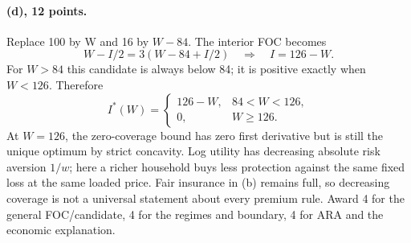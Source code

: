 \paragraph{(d), 12 points.}
Replace 100 by W and 16 by $W-84$. The interior FOC becomes
\[
 W-I/2=3(W-84+I/2)\quad\Rightarrow\quad I=126-W.
\]
For $W>84$ this candidate is always below 84; it is positive exactly when
$W<126$. Therefore
\[
 I^*(W)=\begin{cases}126-W,&84<W<126,\\0,&W\ge126.\end{cases}
\]
At $W=126$, the zero-coverage bound has zero first derivative but is still
the unique optimum by strict concavity. Log utility has decreasing absolute
risk aversion $1/w$; here a richer household buys less protection against
the same fixed loss at the same loaded price. Fair insurance in (b) remains
full, so decreasing coverage is not a universal statement about every
premium rule. Award 4 for the general FOC/candidate, 4 for the regimes and
boundary, 4 for ARA and the economic explanation.

